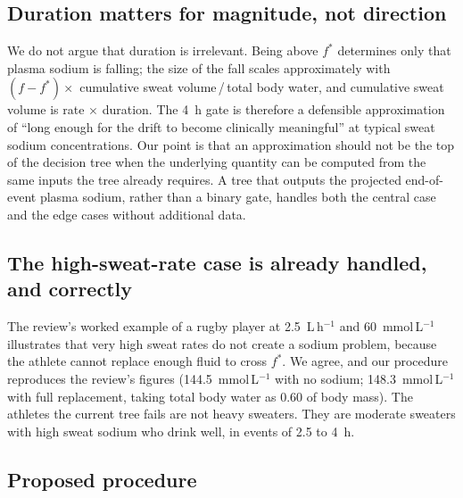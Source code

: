 \documentclass[11pt,a4paper]{article}
\newcommand{\mmolL}{mmol\,L$^{-1}$}
\newcommand{\Lh}{L\,h$^{-1}$}
\newcommand{\fstar}{f^{*}}
\begin{document}
\subsection*{Duration matters for magnitude, not direction}

We do not argue that duration is irrelevant. Being above $\fstar$ determines only that plasma sodium is falling; the size of the fall scales approximately with $(f - \fstar) \times$ cumulative sweat volume\,/\,total body water, and cumulative sweat volume is rate $\times$ duration. The 4~h gate is therefore a defensible approximation of ``long enough for the drift to become clinically meaningful'' at typical sweat sodium concentrations. Our point is that an approximation should not be the top of the decision tree when the underlying quantity can be computed from the same inputs the tree already requires. A tree that outputs the projected end-of-event plasma sodium, rather than a binary gate, handles both the central case and the edge cases without additional data.

\subsection*{The high-sweat-rate case is already handled, and correctly}

The review's worked example of a rugby player at 2.5~\Lh{} and 60~\mmolL{} illustrates that very high sweat rates do not create a sodium problem, because the athlete cannot replace enough fluid to cross $\fstar$. We agree, and our procedure reproduces the review's figures (144.5~\mmolL{} with no sodium; 148.3~\mmolL{} with full replacement, taking total body water as 0.60 of body mass). The athletes the current tree fails are not heavy sweaters. They are moderate sweaters with high sweat sodium who drink well, in events of 2.5 to 4~h.

\subsection*{Proposed procedure}
\end{document}
